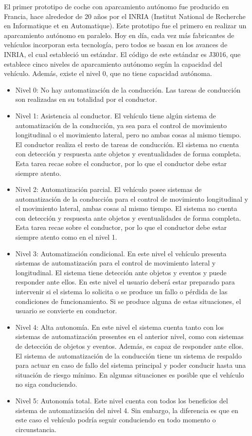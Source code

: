 El primer prototipo de coche con aparcamiento autónomo fue producido en Francia, hace alrededor de 20 años por el INRIA (Institut National de Recherche en Informatique et en Automatique). Este prototipo fue el primero en realizar un aparcamiento autónomo en paralelo. Hoy en día, cada vez más fabricantes de vehículos incorporan esta tecnología, pero todos se basan en los avances de INRIA, el cual estableció un estándar. El código de este estándar es J3016, que establece cinco niveles de aparcamiento autónomo según la capacidad del vehículo. Además, existe el nivel 0, que no tiene capacidad autónoma.

\begin{itemize}
\item Nivel 0: No hay automatización de la conducción. Las tareas de conducción son realizadas en su totalidad por el conductor.
\item	Nivel 1: Asistencia al conductor. El vehículo tiene algún sistema de automatización de la conducción, ya sea para el control de movimiento longitudinal o el movimiento lateral, pero no ambas cosas al mismo tiempo. El conductor realiza el resto de tareas de conducción. El sistema no cuenta con detección y respuesta ante objetos y eventualidades de forma completa. Esta tarea recae sobre el conductor, por lo que el conductor debe estar siempre atento.
\item	Nivel 2: Automatización parcial. El vehículo posee sistemas de automatización de la conducción para el control de movimiento longitudinal y el movimiento lateral, ambas cosas al mismo tiempo. El sistema no cuenta con detección y respuesta ante objetos y eventualidades de forma completa. Esta tarea recae sobre el conductor, por lo que el conductor debe estar siempre atento como en el nivel 1.
\item	Nivel 3: Automatización condicional. En este nivel el vehículo presenta sistemas de automatización para el control de movimiento lateral y longitudinal. El sistema tiene detección ante objetos y eventos y puede responder ante ellos. En este nivel el usuario deberá estar preparado para intervenir si el sistema lo solicita o se produce un fallo o pérdida de las condiciones de funcionamiento. Si se produce alguna de estas situaciones, el usuario se convierte en conductor.
\item Nivel 4: Alta autonomía. En este nivel el sistema cuenta tanto con los sistemas de automatización presentes en el anterior nivel, como con sistemas de detección de objetos y eventos. Además, es capaz de responder ante ellos. El sistema de automatización de la conducción tiene un sistema de respaldo para actuar en caso de fallo del sistema principal y poder conducir hasta una situación de riesgo mínimo. En algunas situaciones es posible que el vehículo no siga conduciendo.
\item	Nivel 5: Autonomía total. Este nivel cuenta con todos los beneficios del sistema de automatización del nivel 4. Sin embargo, la diferencia es que en este caso el vehículo podría seguir conduciendo en todo momento o circunstancia.

\end{itemize}

